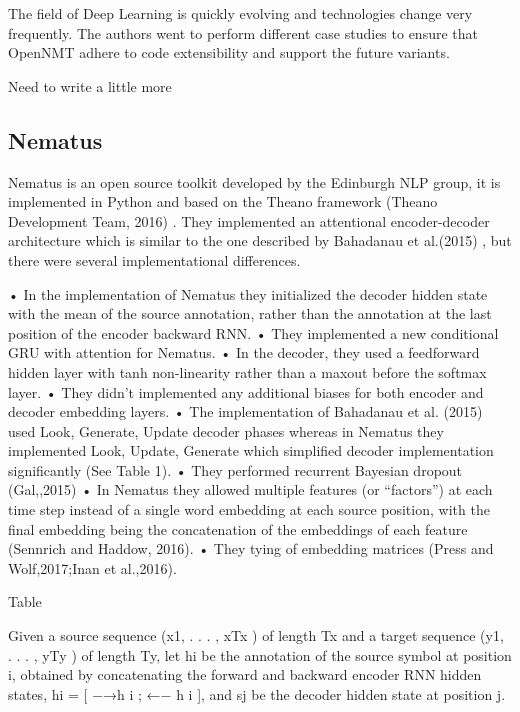 The field of Deep Learning is quickly evolving and technologies change very frequently. The authors went to perform different case studies to ensure that OpenNMT adhere to code extensibility and support the future variants.

Need to write a little more

\subsection{Nematus}

Nematus is an open source toolkit developed by the Edinburgh NLP group, it is implemented in Python and based on the Theano framework (Theano Development Team, 2016) . They implemented an attentional encoder-decoder architecture which is similar to the one described by Bahadanau et al.(2015) , but there were several implementational differences.

•	In the implementation of Nematus they initialized the decoder hidden state with the mean of the source annotation, rather than the annotation at the last position of the encoder backward RNN. 
•	They implemented a new conditional GRU with attention for Nematus.
•	In the decoder, they used a feedforward hidden layer with tanh non-linearity rather than a maxout before the softmax layer.
•	They didn’t implemented any additional biases for both encoder and decoder embedding layers.
•	The implementation of Bahadanau et al. (2015) used Look, Generate, Update decoder phases whereas in Nematus they implemented Look, Update, Generate which simplified decoder implementation significantly (See Table 1). 
•	They performed recurrent Bayesian dropout (Gal,,2015)
•	In Nematus they allowed multiple features (or “factors”) at each time step instead of a single word embedding at each source position, with the final embedding being the concatenation of the embeddings of each feature (Sennrich and Haddow, 2016).
•	They tying of embedding matrices (Press and Wolf,2017;Inan et al.,2016).

Table 







Given a source sequence (x1, . . . , xTx ) of length Tx and a target sequence (y1, . . . , yTy ) of length Ty, let hi be the annotation of the source symbol at position i, obtained by concatenating the forward and backward encoder RNN hidden states, hi = [ −→h i ; ←− h i ], and sj be the decoder hidden state at position j.


